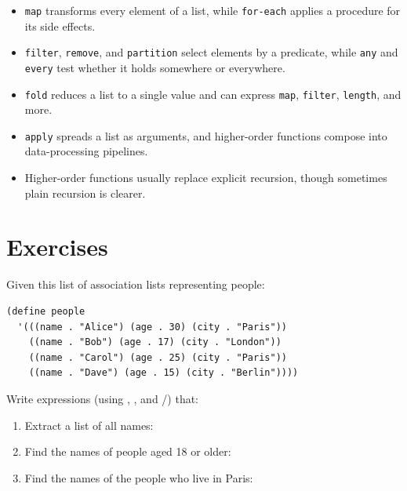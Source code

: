 \begin{itemize}
    \item \texttt{map} transforms every element of a list, while \texttt{for-each} applies a procedure for its side effects.
    \item \texttt{filter}, \texttt{remove}, and \texttt{partition} select elements by a predicate, while \texttt{any} and \texttt{every} test whether it holds somewhere or everywhere.
    \item \texttt{fold} reduces a list to a single value and can express \texttt{map}, \texttt{filter}, \texttt{length}, and more.
    \item \texttt{apply} spreads a list as arguments, and higher-order functions compose into data-processing pipelines.
    \item Higher-order functions usually replace explicit recursion, though sometimes plain recursion is clearer.
\end{itemize}

\section*{Exercises}

\begin{exercise}
Given this list of association lists representing people:

\begin{lstlisting}
(define people
  '(((name . "Alice") (age . 30) (city . "Paris"))
    ((name . "Bob") (age . 17) (city . "London"))
    ((name . "Carol") (age . 25) (city . "Paris"))
    ((name . "Dave") (age . 15) (city . "Berlin"))))
\end{lstlisting}

Write expressions (using , , and /) that:
\begin{enumerate}
\item Extract a list of all names: 
\item Find the names of people aged 18 or older: 
\item Find the names of the people who live in Paris: 
\end{enumerate}
\end{exercise}

